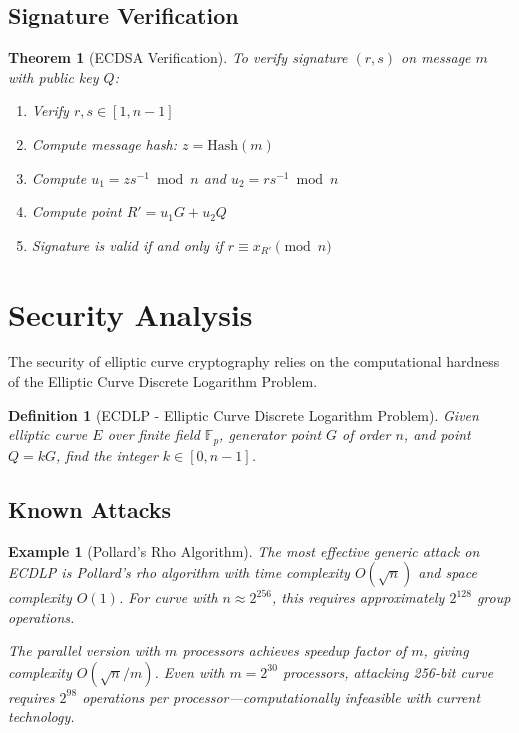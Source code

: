 \documentclass[a4paper, 11pt]{article}
\newtheorem{definition}{Definition}[section]
\newtheorem{theorem}{Theorem}[section]
\newtheorem{example}{Example}[section]
\begin{document}
\subsection{Signature Verification}

\begin{theorem}[ECDSA Verification]
To verify signature $(r, s)$ on message $m$ with public key $Q$:
\begin{enumerate}
\item Verify $r, s \in [1, n-1]$
\item Compute message hash: $z = \text{Hash}(m)$
\item Compute $u_1 = zs^{-1} \bmod n$ and $u_2 = rs^{-1} \bmod n$
\item Compute point $R' = u_1 G + u_2 Q$
\item Signature is valid if and only if $r \equiv x_{R'} \pmod{n}$
\end{enumerate}
\end{theorem}

\section{Security Analysis}

The security of elliptic curve cryptography relies on the computational hardness of the Elliptic Curve Discrete Logarithm Problem.

\begin{definition}[ECDLP - Elliptic Curve Discrete Logarithm Problem]
Given elliptic curve $E$ over finite field $\mathbb{F}_p$, generator point $G$ of order $n$, and point $Q = kG$, find the integer $k \in [0, n-1]$.
\end{definition}

\subsection{Known Attacks}

\begin{example}[Pollard's Rho Algorithm]
The most effective generic attack on ECDLP is Pollard's rho algorithm with time complexity $O(\sqrt{n})$ and space complexity $O(1)$. For curve with $n \approx 2^{256}$, this requires approximately $2^{128}$ group operations.

The parallel version with $m$ processors achieves speedup factor of $m$, giving complexity $O(\sqrt{n}/m)$. Even with $m = 2^{30}$ processors, attacking 256-bit curve requires $2^{98}$ operations per processor—computationally infeasible with current technology.
\end{example}
\end{document}
